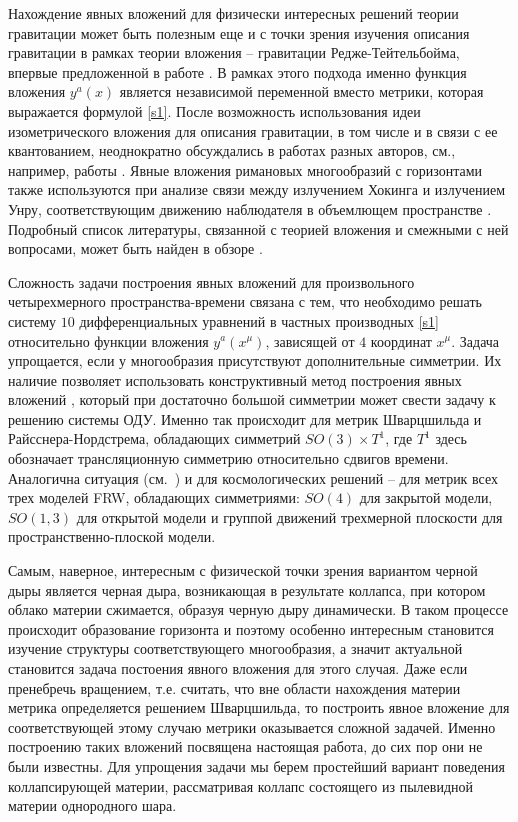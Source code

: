 \documentclass[12pt]{article}
\begin{document}
Нахождение явных вложений для физически интересных решений теории гравитации может быть полезным
еще и с точки зрения изучения описания гравитации в рамках теории вложения -- гравитации Редже-Тейтельбойма, впервые предложенной в работе \cite{regge}.
В рамках этого подхода именно функция вложения $y^a(x)$ является независимой переменной вместо метрики,
которая выражается формулой \eqref{s1}.
После \cite{regge} возможность использования идеи изометрического вложения для описания гравитации, в том числе и в связи с ее квантованием,
неоднократно обсуждались в работах разных авторов, см., например,
работы \cite{deser,pavsic85let,tapia,davkar,statja18,rojas09,statja25,faddeev,statja51}.
Явные вложения римановых многообразий с горизонтами также используются при анализе связи между излучением Хокинга
и излучением Унру, соответствующим движению наблюдателя в объемлющем пространстве \cite{deserlev98,deserlev99,statja34,statja36}.
Подробный список литературы, связанной с теорией вложения и смежными с ней вопросами, может быть найден в обзоре \cite{tapiaob}.

Сложность задачи построения явных вложений для произвольного четырехмерного пространства-времени связана с тем, что
необходимо решать систему $10$ дифференциальных уравнений  в частных производных \eqref{s1} относительно функции вложения $y^a(x^\mu)$,
зависящей от $4$ координат $x^\mu$.
Задача упрощается, если у многообразия присутствуют дополнительные симметрии.
Их наличие позволяет использовать конструктивный метод построения явных вложений \cite{statja27}, который при
достаточно большой симметрии может свести задачу к решению системы ОДУ.
Именно так происходит для метрик Шварцшильда и Райсснера-Нордстрема, обладающих симметрий $SO(3)\times T^1$, где $T^1$ здесь обозначает трансляционную симметрию
относительно сдвигов времени. Аналогична ситуация (см.~\cite{statja29}) и для космологических решений --
для метрик всех трех моделей FRW, обладающих симметриями: $SO(4)$ для закрытой модели, $SO(1,3)$ для открытой модели
и группой движений трехмерной плоскости для пространственно-плоской модели.

Самым, наверное,  интересным с физической точки зрения вариантом черной дыры является черная дыра, возникающая в результате коллапса,
при котором облако материи сжимается, образуя черную дыру динамически. В таком процессе происходит образование горизонта
и поэтому особенно интересным становится изучение структуры соответствующего многообразия, а значит актуальной становится
задача постоения явного вложения для этого случая.
Даже если пренебречь вращением, т.е. считать, что вне области нахождения материи метрика определяется
решением Шварцшильда, то построить явное вложение для соответствующей этому случаю метрики оказывается
сложной задачей. Именно построению таких вложений посвящена настоящая работа, до сих пор они не были известны.
Для упрощения задачи мы берем простейший вариант поведения коллапсирующей материи, рассматривая коллапс
состоящего из пылевидной материи однородного шара.
\end{document}
